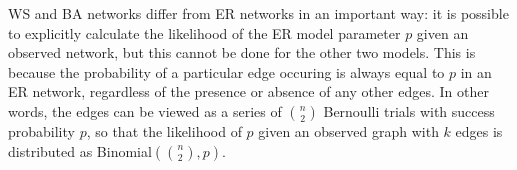 WS and BA networks differ from ER networks in an important way: it is possible
to explicitly calculate the likelihood of the ER model parameter $p$ given an
observed network, but this cannot be done for the other two models. This is
because the probability of a particular edge occuring is always equal to $p$ in
an ER network, regardless of the presence or absence of any other edges. In
other words, the edges can be viewed as a series of $\binom{n}{2}$ Bernoulli
trials with success probability $p$, so that the likelihood of $p$ given an
observed graph with $k$ edges is distributed as 
Binomial$\left(\binom{n}{2}, p\right)$.



